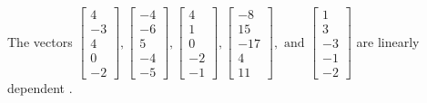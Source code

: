 \begin{exercise}
\begin{exerciseStatement}
  \end{exerciseStatement}
  \begin{exerciseAnswer}
   The vectors \(\left[\begin{array}{r}
4 \\
-3 \\
4 \\
0 \\
-2
\end{array}\right] , \left[\begin{array}{r}
-4 \\
-6 \\
5 \\
-4 \\
-5
\end{array}\right] , \left[\begin{array}{r}
4 \\
1 \\
0 \\
-2 \\
-1
\end{array}\right] , \left[\begin{array}{r}
-8 \\
15 \\
-17 \\
4 \\
11
\end{array}\right] , \text{ and } \left[\begin{array}{r}
1 \\
3 \\
-3 \\
-1 \\
-2
\end{array}\right]\) are 
  	 linearly dependent  .
  


  \end{exerciseAnswer}
\end{exercise}